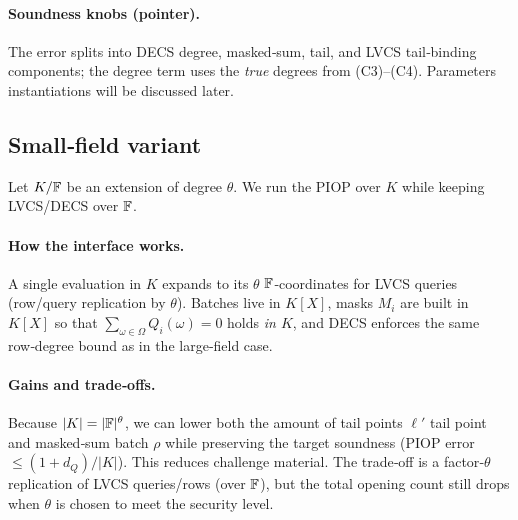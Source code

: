 \paragraph{Soundness knobs (pointer).}
The error splits into DECS degree, masked‑sum, tail, and LVCS tail‑binding components; the degree term uses the \emph{true} degrees from (C3)–(C4). Parameters instantiations will be discussed later.

\subsection{Small‑field variant}
\label{subsec:smallfield}


Let $K/\mathbb{F}$ be an extension of degree $\theta$. We run the PIOP over $K$ while keeping LVCS/DECS over $\mathbb{F}$.

\paragraph{How the interface works.}
A single evaluation in $K$ expands to its $\theta$ $\mathbb{F}$‑coordinates for LVCS queries (row/query replication by $\theta$). Batches live in $K[X]$, masks $M_i$ are built in $K[X]$ so that $\sum_{\omega\in\Omega} Q_i(\omega)=0$ holds \emph{in $K$}, and DECS enforces the same row‑degree bound as in the large‑field case.

\paragraph{Gains and trade‑offs.}
Because $|K|=|\mathbb{F}|^\theta$, we can lower both the amount of tail points $\ell'$ tail point and masked‑sum batch $\rho$  while preserving the target soundness (PIOP error $\le (1+d_Q)/|K|$). This reduces challenge material. The trade‑off is a factor‑$\theta$ replication of LVCS queries/rows (over $\mathbb{F}$), but the total opening count still drops when $\theta$ is chosen to meet the security level.
